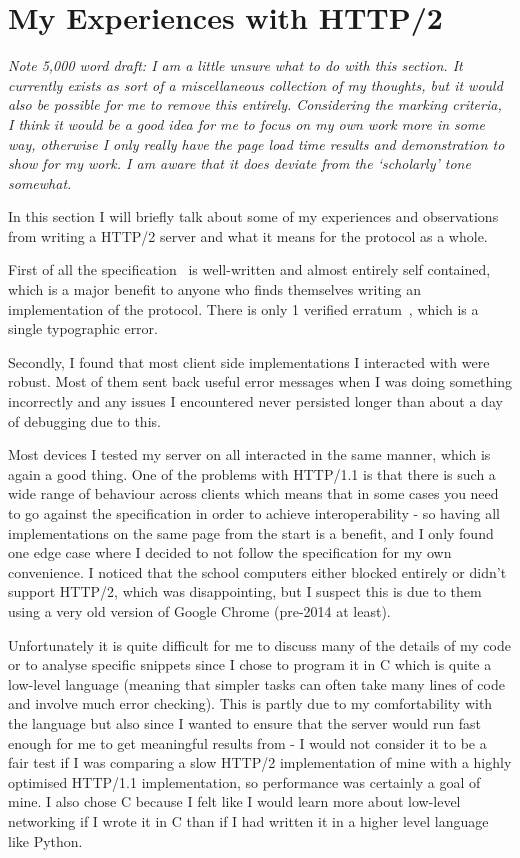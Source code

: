 \section{My Experiences with HTTP/2}

\textit{Note 5,000 word draft: I am a little unsure what to do with this section. It currently exists as sort of a miscellaneous collection of my thoughts, but it would also be possible for me to remove this entirely. Considering the marking criteria, I think it would be a good idea for me to focus on my own work more in some way, otherwise I only really have the page load time results and demonstration to show for my work. I am aware that it does deviate from the `scholarly' tone somewhat.} 

In this section I will briefly talk about some of my experiences and observations from writing a HTTP/2 server and what it means for the protocol as a whole.

First of all the specification~\cite{h2} is well-written and almost entirely self contained, which is a major benefit to anyone who finds themselves writing an implementation of the protocol. There is only 1 verified erratum~\cite{h2-errata}, which is a single typographic error.

Secondly, I found that most client side implementations I interacted with were robust. Most of them sent back useful error messages when I was doing something incorrectly and any issues I encountered never persisted longer than about a day of debugging due to this.

Most devices I tested my server on all interacted in the same manner, which is again a good thing. One of the problems with HTTP/1.1 is that there is such a wide range of behaviour across clients which means that in some cases you need to go against the specification in order to achieve interoperability - so having all implementations on the same page from the start is a benefit, and I only found one edge case where I decided to not follow the specification for my own convenience. I noticed that the school computers either blocked entirely or didn't support HTTP/2, which was disappointing, but I suspect this is due to them using a very old version of Google Chrome (pre-2014 at least).

Unfortunately it is quite difficult for me to discuss many of the details of my code or to analyse specific snippets since I chose to program it in C which is quite a low-level language (meaning that simpler tasks can often take many lines of code and involve much error checking). This is partly due to my comfortability with the language but also since I wanted to ensure that the server would run fast enough for me to get meaningful results from - I would not consider it to be a fair test if I was comparing a slow HTTP/2 implementation of mine with a highly optimised HTTP/1.1 implementation, so performance was certainly a goal of mine. I also chose C because I felt like I would learn more about low-level networking if I wrote it in C than if I had written it in a higher level language like Python.

